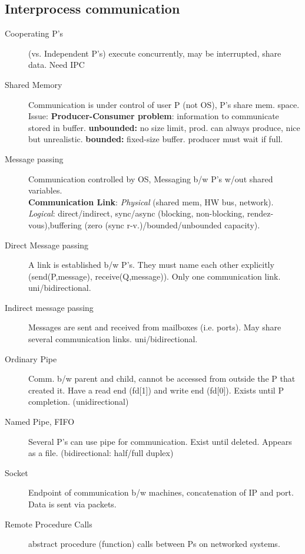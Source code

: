 \subsection*{Interprocess communication}
\begin{description}
    \item[Cooperating P's](vs. Independent P's) execute concurrently, may be interrupted, share data. Need IPC
    \item[Shared Memory]Communication is under control of user P (not OS), P's share mem. space. Issue: \textbf{Producer-Consumer problem}: information to communicate stored in buffer. \textbf{unbounded:} no size limit, prod. can always produce, nice but unrealistic. \textbf{bounded:} fixed-size buffer. producer must wait if full.
  \item[Message passing] Communication controlled by OS, Messaging b/w P's w/out shared variables.\\
    \textbf{Communication Link}: \textit{Physical} (shared mem, HW bus, network). \textit{Logical}: direct/indirect, sync/async (blocking, non-blocking, rendez-vous),buffering (zero (sync r-v.)/bounded/unbounded capacity).
  \item[Direct Message passing] A link is established b/w P's. They must name each other explicitly (send(P,message), receive(Q,message)). Only one communication link. uni/bidirectional.
  \item[Indirect message passing] Messages are sent and received from mailboxes (i.e. ports). May share several communication links. uni/bidirectional.
  \item[Ordinary Pipe] Comm. b/w parent and child, cannot be accessed from outside the P that created it. Have a read end (fd[1]) and write end (fd[0]). Exists until P completion. (unidirectional)
  \item[Named Pipe, FIFO] Several P's can use pipe for communication. Exist until deleted. Appears as a file. (bidirectional: half/full duplex) %
  \item[Socket] Endpoint of communication b/w machines, concatenation of IP and port. Data is sent via packets.
  \item[Remote Procedure Calls] abstract procedure (function) calls between Ps on networked systems. %
\end{description}
